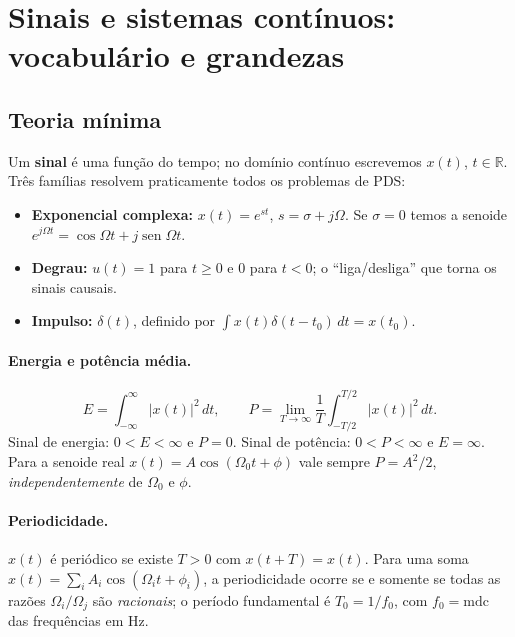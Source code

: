\section{Sinais e sistemas contínuos: vocabulário e grandezas}

\subsection*{Teoria mínima}

Um \textbf{sinal} é uma função do tempo; no domínio contínuo escrevemos $x(t)$,
$t\in\mathbb{R}$. Três famílias resolvem praticamente todos os problemas de PDS:

\begin{itemize}
  \item \textbf{Exponencial complexa:} $x(t)=e^{st}$, $s=\sigma+j\Omega$. Se
        $\sigma=0$ temos a senoide $e^{j\Omega t}=\cos\Omega t+j\operatorname{sen}\Omega t$.
  \item \textbf{Degrau:} $u(t)=1$ para $t\ge 0$ e $0$ para $t<0$; o ``liga/desliga''
        que torna os sinais causais.
  \item \textbf{Impulso:} $\delta(t)$, definido por $\int x(t)\delta(t-t_0)\,dt=x(t_0)$.
\end{itemize}

\paragraph{Energia e potência média.}
\[
  E=\int_{-\infty}^{\infty}|x(t)|^2\,dt, \qquad
  P=\lim_{T\to\infty}\frac{1}{T}\int_{-T/2}^{T/2}|x(t)|^2\,dt .
\]
Sinal de energia: $0<E<\infty$ e $P=0$. Sinal de potência: $0<P<\infty$ e
$E=\infty$. Para a senoide real $x(t)=A\cos(\Omega_0 t+\phi)$ vale sempre
$P=A^2/2$, \emph{independentemente} de $\Omega_0$ e $\phi$.

\paragraph{Periodicidade.} $x(t)$ é periódico se existe $T>0$ com
$x(t+T)=x(t)$. Para uma soma $x(t)=\sum_i A_i\cos(\Omega_i t+\phi_i)$, a
periodicidade ocorre se e somente se todas as razões $\Omega_i/\Omega_j$ são
\emph{racionais}; o período fundamental é $T_0=1/f_0$, com $f_0=\mathrm{mdc}$
das frequências em Hz.


